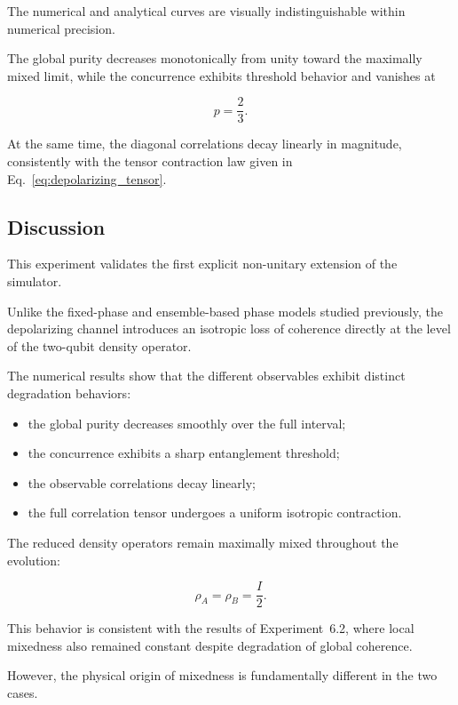The numerical and analytical curves are visually indistinguishable within numerical precision.

The global purity decreases monotonically from unity toward the maximally mixed limit, while the concurrence exhibits threshold behavior and vanishes at

\[
p
=
\frac{2}{3}.
\]

At the same time, the diagonal correlations decay linearly in magnitude, consistently with the tensor contraction law given in Eq.~\eqref{eq:depolarizing_tensor}.


\subsection*{Discussion}

This experiment validates the first explicit non-unitary extension of the simulator.

Unlike the fixed-phase and ensemble-based phase models studied previously, the depolarizing channel introduces an isotropic loss of coherence directly at the level of the two-qubit density operator.

The numerical results show that the different observables exhibit distinct degradation behaviors:

\begin{itemize}
    \item the global purity decreases smoothly over the full interval;
    \item the concurrence exhibits a sharp entanglement threshold;
    \item the observable correlations decay linearly;
    \item the full correlation tensor undergoes a uniform isotropic contraction.
\end{itemize}

The reduced density operators remain maximally mixed throughout the evolution:

\[
\rho_A
=
\rho_B
=
\frac{I}{2}.
\]

This behavior is consistent with the results of Experiment~6.2, where local mixedness also remained constant despite degradation of global coherence.

However, the physical origin of mixedness is fundamentally different in the two cases.

